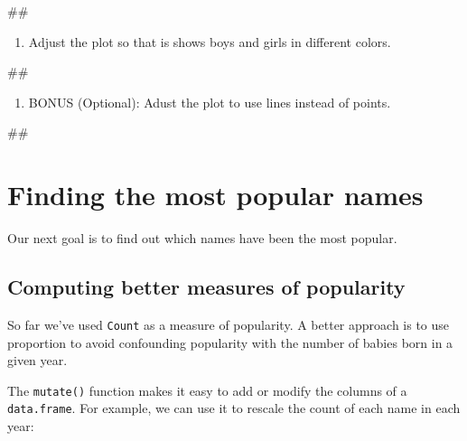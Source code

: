 \documentclass[]{book}
\newenvironment{Shaded}{\begin{snugshade}}{\end{snugshade}}
\newcommand{\NormalTok}[1]{#1}
\providecommand{\tightlist}{%
  \setlength{\itemsep}{0pt}\setlength{\parskip}{0pt}}
\begin{document}
\begin{Shaded}
\begin{Highlighting}[]
\NormalTok{##}
\end{Highlighting}
\end{Shaded}

\begin{enumerate}
\def\labelenumi{\arabic{enumi}.}
\setcounter{enumi}{2}
\tightlist
\item
  Adjust the plot so that is shows boys and girls in different colors.
\end{enumerate}

\begin{Shaded}
\begin{Highlighting}[]
\NormalTok{##}
\end{Highlighting}
\end{Shaded}

\begin{enumerate}
\def\labelenumi{\arabic{enumi}.}
\setcounter{enumi}{3}
\tightlist
\item
  BONUS (Optional): Adust the plot to use lines instead of points.
\end{enumerate}

\begin{Shaded}
\begin{Highlighting}[]
\NormalTok{##}
\end{Highlighting}
\end{Shaded}

\section{Finding the most popular
names}\label{finding-the-most-popular-names}

Our next goal is to find out which names have been the most popular.

\subsection{Computing better measures of
popularity}\label{computing-better-measures-of-popularity}

So far we've used \texttt{Count} as a measure of popularity. A better
approach is to use proportion to avoid confounding popularity with the
number of babies born in a given year.

The \texttt{mutate()} function makes it easy to add or modify the
columns of a \texttt{data.frame}. For example, we can use it to rescale
the count of each name in each year:
\end{document}
